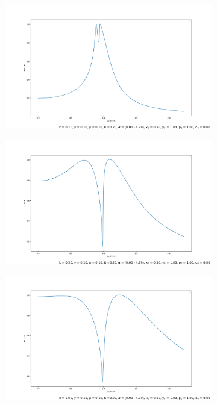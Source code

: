 \documentclass[oneside,10pt,a4paper]{report}
\begin{document}
\begin{figure}[H]
\begin{subfigure}[b]{0.45\textwidth}
			\caption{}
			\label{fig:resonanz2}
		\end{subfigure}
		\begin{subfigure}[b]{0.45\textwidth}
			\includegraphics[width=\textwidth]{resonanz3.png}
			\caption{}
			\label{fig:resonanz3}
		\end{subfigure}
		\hfill
		\begin{subfigure}[b]{0.45\textwidth}
			\includegraphics[width=\textwidth]{resonanz4.png}
			\caption{}
			\label{fig: resonanz4}
		\end{subfigure}
		\begin{subfigure}[b]{0.45\textwidth}
			\includegraphics[width=\textwidth]{resonanz5.png}
			\caption{}
			\label{fig:resonanz5}
		\end{subfigure}
		

\end{figure}
\end{document}
